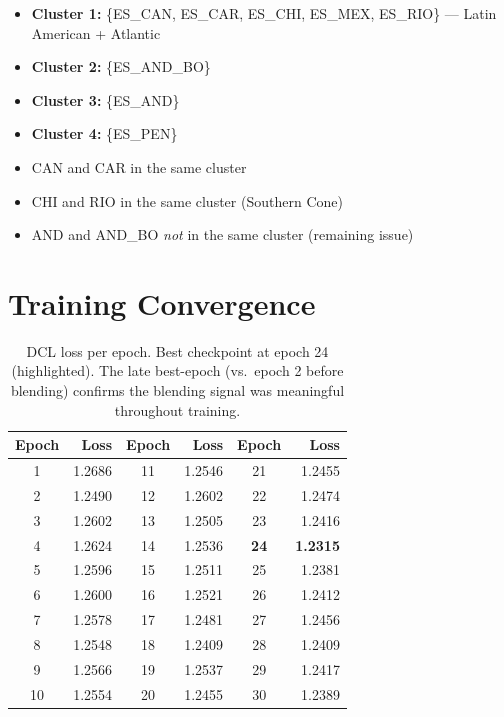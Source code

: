 \documentclass[11pt,a4paper]{article}
\begin{document}
\begin{itemize}[nosep]
\item \textbf{Cluster 1:} \{ES\_CAN, ES\_CAR, ES\_CHI, ES\_MEX, ES\_RIO\} --- Latin American + Atlantic
\item \textbf{Cluster 2:} \{ES\_AND\_BO\}
\item \textbf{Cluster 3:} \{ES\_AND\}
\item \textbf{Cluster 4:} \{ES\_PEN\}
\end{itemize}

\begin{itemize}[nosep]
\item[\checkmark] CAN and CAR in the same cluster
\item[\checkmark] CHI and RIO in the same cluster (Southern Cone)
\item[$\times$] AND and AND\_BO \emph{not} in the same cluster (remaining issue)
\end{itemize}

\section{Training Convergence}

\begin{table}[H]
\centering\small
\begin{tabular}{@{}cr|cr|cr@{}}
\toprule
\textbf{Epoch} & \textbf{Loss} & \textbf{Epoch} & \textbf{Loss} & \textbf{Epoch} & \textbf{Loss} \\
\midrule
1  & 1.2686 & 11 & 1.2546 & 21 & 1.2455 \\
2  & 1.2490 & 12 & 1.2602 & 22 & 1.2474 \\
3  & 1.2602 & 13 & 1.2505 & 23 & 1.2416 \\
4  & 1.2624 & 14 & 1.2536 & \cellcolor{green!15}\textbf{24} & \cellcolor{green!15}\textbf{1.2315} \\
5  & 1.2596 & 15 & 1.2511 & 25 & 1.2381 \\
6  & 1.2600 & 16 & 1.2521 & 26 & 1.2412 \\
7  & 1.2578 & 17 & 1.2481 & 27 & 1.2456 \\
8  & 1.2548 & 18 & 1.2409 & 28 & 1.2409 \\
9  & 1.2566 & 19 & 1.2537 & 29 & 1.2417 \\
10 & 1.2554 & 20 & 1.2455 & 30 & 1.2389 \\
\bottomrule
\end{tabular}
\caption{DCL loss per epoch. Best checkpoint at epoch 24 (highlighted). The late best-epoch (vs.\ epoch 2 before blending) confirms the blending signal was meaningful throughout training.}
\label{tab:loss}
\end{table}
\end{document}

